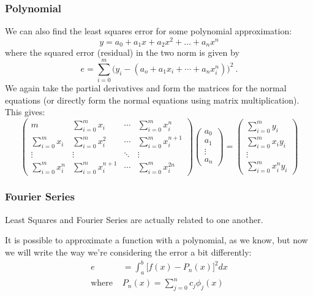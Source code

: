 \documentclass[12pt]{exam}
\begin{document}
\subsubsection*{Polynomial}
We can also find the least squares error for some polynomial approximation:
%
\[y = a_0 + a_1 x + a_2 x^2 + \dots +a_n x^n\]
%
where the squared error (residual) in the two norm is given by
%
\[e = \sum_{i=0}^m \bigl(y_i - (a_o + a_1 x_i+ \cdots + a_n x_i^n)\bigr)^2 \:.\]
%
We again take the partial derivatives and form the matrices for the normal equations (or directly form the normal equations using matrix multiplication). This gives:
%
\begin{equation}
\begin{pmatrix}
m                & \sum_{i=0}^m x_i & \cdots & \sum_{i=0}^m x_i^n \\
\sum_{i=0}^m x_i & \sum_{i=0}^m x_i^2 & \cdots & \sum_{i=0}^m x_i^{n+1} \\ 
\vdots & \vdots & \ddots & \vdots \\
\sum_{i=0}^m x_i^n & \sum_{i=0}^m x_i^{n+1} & \cdots & \sum_{i=0}^m x_i^{2n}
\end{pmatrix}
\begin{pmatrix}
a_0 \\ a_1 \\ \vdots \\ a_n
\end{pmatrix} =
\begin{pmatrix}
\sum_{i=0}^m y_i \\ \sum_{i=0}^m x_i y_i \\ \vdots \\ \sum_{i=0}^m x_i^n y_i \nonumber
\end{pmatrix}
\end{equation}

\subsubsection*{Fourier Series}
Least Squares and Fourier Series are actually related to one another. 

It is possible to approximate a function with a polynomial, as we know, but now we will write the way we're considering the error a bit differently:
%
\ifprintanswers
\begin{align}
e &=\int_a^b \bigl[f(x) - P_n(x)\bigr]^2 dx \nonumber\\
\text{where }& P_n(x) = \sum_{j=0}^{n} c_j \phi_j(x) \nonumber
\end{align}
\else
\\\vspace*{5em}
\fi
\end{document}
